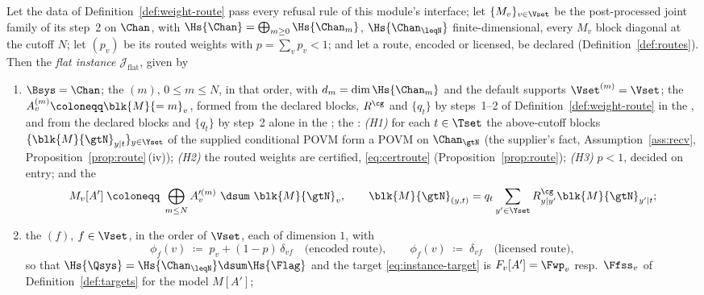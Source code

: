 \begin{proposition}
\label{prop:flat-instance}
Let the data of Definition~\ref{def:weight-route} pass every refusal rule of
this module's interface; let
$\{M_v\}_{v\in\Vset}$ be the post-processed joint family of its step~2 on
$\Chan$, with $\Hs{\Chan}=\bigoplus_{m\ge0}\Hs{\Chan_m}$, $\Hs{\Chan_{\leqN}}$
finite-dimensional, every $M_v$ block diagonal at the cutoff $N$; let $(p_v)$
be its routed weights with $p=\sum_vp_v<1$; and let a route, encoded or
licensed, be declared (Definition~\ref{def:routes}). Then the \emph{flat instance}
$\mathcal{J}_{\mathrm{flat}}$, given by
\begin{enumerate}[label=(I\arabic*),leftmargin=3.0em]
\item $\Bsys=\Chan$; the  $(m)$, $0\le m\le N$, in that order,
  with $d_m=\dim\Hs{\Chan_m}$ and the default supports $\Vset^{(m)}=\Vset$;
  the  $A^{(m)}_v\coloneqq\blk{M}{=m}_v$, formed from the declared
  blocks, $R^{\cg}$ and $\{q_t\}$ by steps~1--2 of
  Definition~\ref{def:weight-route} in the , and from the
  declared blocks and $\{q_t\}$ by step~2 alone in the
  ; the : \emph{(H1)} for
  each $t\in\Tset$ the above-cutoff blocks $\{\blk{M}{\gtN}_{y|t}\}_{y\in\Yset}$
  of the supplied conditional POVM form a POVM on $\Chan_{\gtN}$
  (the supplier's fact, Assumption~\ref{ass:recv},
  Proposition~\ref{prop:route}\,(iv)); \emph{(H2)} the routed weights are
  certified, \eqref{eq:certroute} (Proposition~\ref{prop:route});
  \emph{(H3)} $p<1$, decided on entry; and the 
  \begin{equation}\label{eq:flat-model}
    M_v[A']\;\coloneqq\;\bigoplus_{m\le N}A'^{(m)}_v\ \dsum\ \blk{M}{\gtN}_v,
    \qquad
    \blk{M}{\gtN}_{(y,t)}=q_t\sum_{y'\in\Yset}R^{\cg}_{y|y'}\blk{M}{\gtN}_{y'|t} ;
  \end{equation}
\item the  $(f)$, $f\in\Vset$, in the order of $\Vset$, each of
  dimension $1$, with
  \begin{equation}\label{eq:flat-scalars}
    \phi_f(v)\;\coloneqq\;p_v+(1-p)\,\delta_{vf}\quad\text{(encoded route)},
    \qquad
    \phi_f(v)\;\coloneqq\;\delta_{vf}\quad\text{(licensed route)},
  \end{equation}
  so that $\Hs{\Qsys}=\Hs{\Chan_{\leqN}}\dsum\Hs{\Flag}$ and the target
  \eqref{eq:instance-target} is $F_v[A']=\Fwp_v$ resp.\ $\Ffss_v$ of
  Definition~\ref{def:targets} for the model $M[A']$;

\end{enumerate}
\end{proposition}

